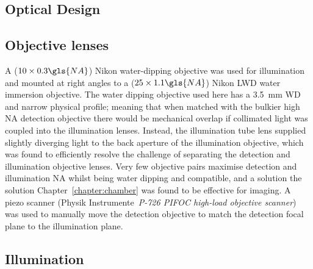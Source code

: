 \subsection{Optical Design}

\subsection{Objective lenses}


A (\emph{\(10\times 0.3 \gls{NA}\)}) Nikon water-dipping objective was used for illumination and mounted at right angles to a (\emph{\(25\times1.1 \gls{NA}\)}) Nikon LWD water immersion objective.
The water dipping objective used here has a \SI{3.5}{\milli\meter} WD and narrow physical profile; meaning that when matched with the bulkier high NA detection objective
there would be mechanical overlap if collimated light was coupled into the illumination lenses.
Instead, the illumination tube lens supplied slightly diverging light to the back aperture of the illumination objective, which was found to efficiently resolve the challenge of separating the detection and illumination objective lenses.
Very few objective pairs maximise detection and illumination \gls{NA} whilst being water dipping and compatible, and a solution the solution Chapter~\ref{chapter:chamber} was found to be effective for imaging.
A piezo scanner (Physik Instrumente~\emph{P-726 PIFOC high-load objective scanner}) was used to manually move the detection objective to match the detection focal plane to the illumination plane.

\subsection{Illumination}

